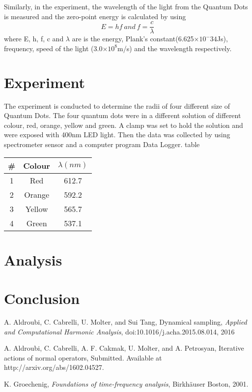 \documentclass[12pt]{report}
\begin{document}
Similarly, in the experiment, the wavelength of the light from the Quantum Dots is measured and the zero-point energy is calculated by using
\begin{equation}
    E = hf \: and \: f = \frac{c}{\lambda}
\end{equation}
where E, h, f, c and $\lambda$ are is the energy, Plank's constant(6.625$\times 10^-34$Js), frequency, speed of the light (3.0$\times 10^8$m/s) and the wavelength respectively.


\section{Experiment}
The experiment is conducted to determine the radii of four different size of Quantum Dots. The four quantum dots were in a different solution of different colour, red, orange, yellow and green. A clamp was set to hold the solution and were exposed with 400nm LED light. Then the data was collected by using spectrometer sensor and a computer program Data Logger.
\newline
table
\begin{center}
\begin{tabular}{ |c c c| } 
\hline
 \# & Colour & $\lambda(nm)$\\
\hline
1 & Red & 612.7\\
2 & Orange & 592.2 \\ 
3 & Yellow & 565.7 \\ 
4 & Green & 537.1 \\ 
\hline
\end{tabular}
\end{center}


\section{Analysis}

\section{Conclusion}






 
\begin{thebibliography}{111}
   
A. Aldroubi, C. Cabrelli, U. Molter, and Sui Tang,
Dynamical sampling, 
{\it  Applied and Computational Harmonic Analysis}, doi:10.1016/j.acha.2015.08.014, 2016

{}
    A. Aldroubi, C. Cabrelli, A. F. Cakmak, U. Molter,  and A. Petrosyan,
    Iterative actions of normal operators, 
    Submitted. Available at http://arxiv.org/abs/1602.04527.
  
    K. Groechenig,
    {\it Foundations of time-frequency analysis}, 
    Birkh\"auser Boston, 2001.

\end{thebibliography}
\end{document}
